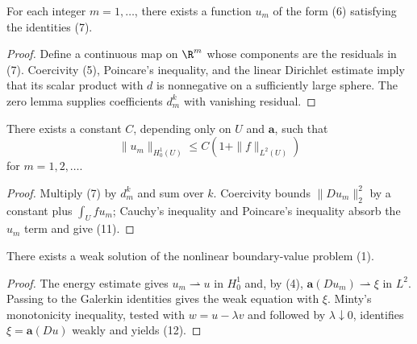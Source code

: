 \begin{theorem}
\label{thm:monotonicity-approximate-solutions}
For each integer $m = 1, \ldots$, there exists a function $u_m$ of the form (6) satisfying the identities (7).
\end{theorem}

\begin{proof}
\sketch Define a continuous map on $\R^m$ whose components are the residuals in (7). Coercivity (5), Poincare's inequality, and the linear Dirichlet estimate imply that its scalar product with $d$ is nonnegative on a sufficiently large sphere. The zero lemma supplies coefficients $d_m^k$ with vanishing residual.
\end{proof}

\begin{theorem}
\label{thm:monotonicity-energy-estimates}
There exists a constant $C$, depending only on $U$ and $\mathbf{a}$, such that
\[
\|u_m\|_{H^1_0(U)} \leq C(1 + \|f\|_{L^2(U)})
\tag{11}
\]
for $m = 1, 2, \ldots$.
\end{theorem}

\begin{proof}
\sketch Multiply (7) by $d_m^k$ and sum over $k$. Coercivity bounds $\|Du_m\|_2^2$ by a constant plus $\int_Ufu_m$; Cauchy's inequality and Poincare's inequality absorb the $u_m$ term and give (11).
\end{proof}

\begin{theorem}
\label{thm:monotonicity-existence-weak-solution}
There exists a weak solution of the nonlinear boundary-value problem (1).
\end{theorem}

\begin{proof}
\sketch The energy estimate gives $u_m\rightharpoonup u$ in $H_0^1$ and, by (4), $\mathbf a(Du_m)\rightharpoonup\xi$ in $L^2$. Passing to the Galerkin identities gives the weak equation with $\xi$. Minty's monotonicity inequality, tested with $w=u-\lambda v$ and followed by $\lambda\downarrow0$, identifies $\xi=\mathbf a(Du)$ weakly and yields (12).
\end{proof}

